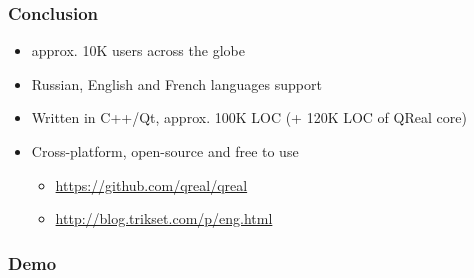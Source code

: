 \documentclass[xetex,mathserif,serif]{beamer}
\begin{document}
	\begin{frame}
		\frametitle{Conclusion}
		\begin{itemize}
			\item approx. 10K users across the globe
			\item Russian, English and French languages support
			\item Written in C++/Qt, approx. 100K LOC (+ 120K LOC of QReal core)
			\item Cross-platform, open-source and free to use
			\begin{itemize}
				\item \href{https://github.com/qreal/qreal}{https://github.com/qreal/qreal}
				\item \href{http://blog.trikset.com/p/eng.html}{http://blog.trikset.com/p/eng.html}
			\end{itemize}
		\end{itemize}
	\end{frame}

	\begin{frame}
		\frametitle{Demo}
		\center{\Huge{\textcolor{cadmiumgreen}{Demonstration}}}
	\end{frame}
\end{document}
